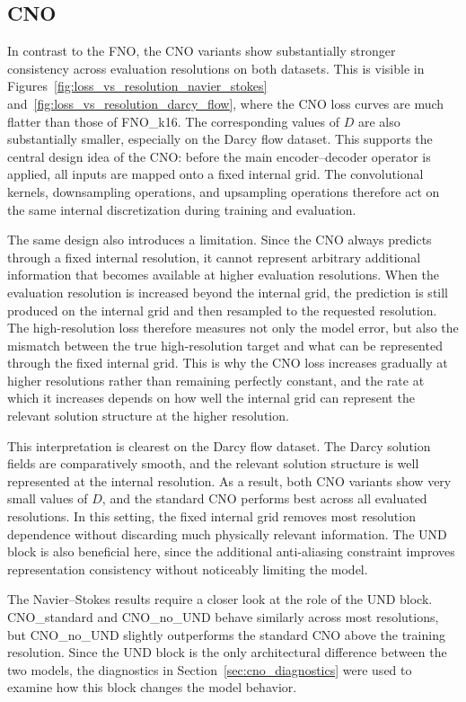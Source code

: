 \subsection{CNO}
\label{sec:cno_discussion}

In contrast to the FNO, the CNO variants show substantially stronger consistency across evaluation resolutions on both datasets. This is visible in Figures~\ref{fig:loss_vs_resolution_navier_stokes} and~\ref{fig:loss_vs_resolution_darcy_flow}, where the CNO loss curves are much flatter than those of FNO\_k16. The corresponding values of \(D\) are also substantially smaller, especially on the Darcy flow dataset. This supports the central design idea of the CNO: before the main encoder--decoder operator is applied, all inputs are mapped onto a fixed internal grid. The convolutional kernels, downsampling operations, and upsampling operations therefore act on the same internal discretization during training and evaluation.

The same design also introduces a limitation. Since the CNO always predicts through a fixed internal resolution, it cannot represent arbitrary additional information that becomes available at higher evaluation resolutions. When the evaluation resolution is increased beyond the internal grid, the prediction is still produced on the internal grid and then resampled to the requested resolution. The high-resolution loss therefore measures not only the model error, but also the mismatch between the true high-resolution target and what can be represented through the fixed internal grid. This is why the CNO loss increases gradually at higher resolutions rather than remaining perfectly constant, and the rate at which it increases depends on how well the internal grid can represent the relevant solution structure at the higher resolution.

This interpretation is clearest on the Darcy flow dataset. The Darcy solution fields are comparatively smooth, and the relevant solution structure is well represented at the internal resolution. As a result, both CNO variants show very small values of \(D\), and the standard CNO performs best across all evaluated resolutions. In this setting, the fixed internal grid removes most resolution dependence without discarding much physically relevant information. The UND block is also beneficial here, since the additional anti-aliasing constraint improves representation consistency without noticeably limiting the model.

The Navier--Stokes results require a closer look at the role of the UND block. CNO\_standard and CNO\_no\_UND behave similarly across most resolutions, but CNO\_no\_UND slightly outperforms the standard CNO above the training resolution. Since the UND block is the only architectural difference between the two models, the diagnostics in Section~\ref{sec:cno_diagnostics} were used to examine how this block changes the model behavior.


